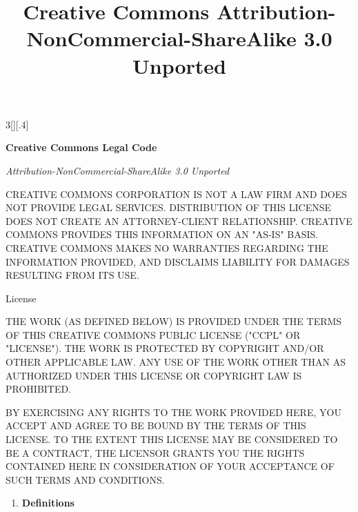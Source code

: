 \documentclass[8pt,a4paper]{article}
\title{Creative Commons Attribution-NonCommercial-ShareAlike 3.0 Unported}
\begin{document}
%

\begin{multicols}{3}[][.4\paperwidth]%
 {%

  \textbf{Creative Commons Legal Code}
  \smallskip 

  \emph{Attribution-NonCommercial-ShareAlike 3.0 Unported}
  \smallskip

  CREATIVE COMMONS CORPORATION IS NOT A LAW FIRM AND DOES NOT PROVIDE
  LEGAL SERVICES. DISTRIBUTION OF THIS LICENSE DOES NOT CREATE AN
  ATTORNEY-CLIENT RELATIONSHIP. CREATIVE COMMONS PROVIDES THIS
  INFORMATION ON AN "AS-IS" BASIS. CREATIVE COMMONS MAKES NO WARRANTIES
  REGARDING THE INFORMATION PROVIDED, AND DISCLAIMS LIABILITY FOR
  DAMAGES RESULTING FROM ITS USE.
  

 \medskip
  License
  \smallskip

  THE WORK (AS DEFINED BELOW) IS PROVIDED UNDER THE TERMS OF THIS CREATIVE
  COMMONS PUBLIC LICENSE ("CCPL" OR "LICENSE"). THE WORK IS PROTECTED BY
  COPYRIGHT AND/OR OTHER APPLICABLE LAW. ANY USE OF THE WORK OTHER THAN AS
  AUTHORIZED UNDER THIS LICENSE OR COPYRIGHT LAW IS PROHIBITED.
  
  BY EXERCISING ANY RIGHTS TO THE WORK PROVIDED HERE, YOU ACCEPT AND AGREE
  TO BE BOUND BY THE TERMS OF THIS LICENSE. TO THE EXTENT THIS LICENSE MAY
  BE CONSIDERED TO BE A CONTRACT, THE LICENSOR GRANTS YOU THE RIGHTS
  CONTAINED HERE IN CONSIDERATION OF YOUR ACCEPTANCE OF SUCH TERMS AND
  CONDITIONS.

}

\bigskip
\begin{enumerate}  
  \item \textbf{Definitions}

  \begin{enumerate}


\end{enumerate}
\end{enumerate}
\end{multicols}
\end{document}
